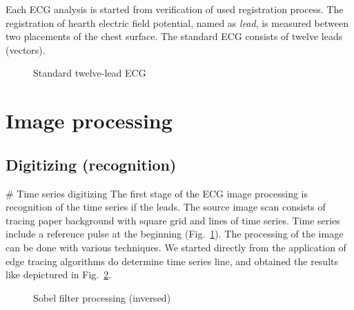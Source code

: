 \documentclass[runningheads]{AIIT}
\begin{document}
Each ECG analysis is started from verification of used registration process.  The registration of hearth electric field potential, named as \emph{lead}, is measured between two placements of the chest surface.  The standard ECG consists of twelve leads (vectors).

\begin{figure}[htb]
  \centering

  \caption{Standard twelve-lead ECG}
  \label{fig:leads-ex}
\end{figure}

\section{Image processing}
\label{sec:image-processing}

\subsection{Digitizing (recognition)}
\label{sec:digit-recogn}

# Time series digitizing
The first stage of the ECG image processing is recognition of the time series if the leads.  The source image scan consists of tracing paper background with square grid and lines of time series.  Time series include a reference pulse at the beginning (Fig.~\ref{fig:leads-ex}).  The processing of the image can be done with various techniques.  We started directly from the application of edge tracing algorithms do determine time series line, and obtained the results like depictured in Fig.~\ref{fig:sobel-ex}.

\begin{figure}[htb]
  \centering

  \caption{Sobel filter processing (inversed)}
  \label{fig:sobel-ex}
\end{figure}
\end{document}
